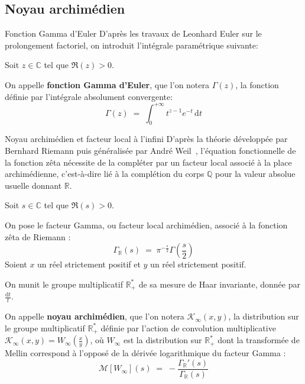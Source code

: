 \documentclass[Riemann_Hypothesis.tex]{subfiles}
\begin{document}
\color{red}
\subsection{Noyau archimédien}
\color{black}

\begin{DefNef}[label=df:FonctionGammaEuler_fr]{Fonction Gamma d'Euler}
    D'après les travaux de Leonhard Euler sur le prolongement factoriel,
    on introduit l'intégrale paramétrique suivante: \par
    Soit $z \in \mathbb{C}$ tel que $\Re(z) > 0$. \par
    On appelle \textbf{fonction Gamma d'Euler}, que l'on notera $\Gamma(z)$,
    la fonction définie par l'intégrale absolument convergente:
    \begin{equation*}
        \Gamma(z) \;=\; \int_{0}^{+\infty} t^{z-1} e^{-t} \,\mathrm{d}t
    \end{equation*}
\end{DefNef}

\begin{DefNef}[label=df:NoyauArchimedien_fr]{Noyau archimédien et facteur local à l'infini}
    D'après la théorie développée par Bernhard Riemann puis généralisée par André 
    Weil~\cite{weil1952_formules},
    l'équation fonctionnelle de la fonction zêta nécessite de la compléter par un facteur local associé à la place archimédienne, c'est-à-dire lié à la complétion du corps $\mathbb{Q}$ pour la valeur absolue usuelle donnant $\mathbb{R}$. \par
    Soit $s \in \mathbb{C}$ tel que $\Re(s) > 0$. \par
    On pose le facteur Gamma, ou facteur local archimédien, associé à la fonction zêta de Riemann :
    \begin{equation*}
        \Gamma_{\mathbb{R}}(s) \;=\; \pi^{-\frac{s}{2}} \Gamma\left(\frac{s}{2}\right)
    \end{equation*}
    Soient $x$ un réel strictement positif et $y$ un réel strictement positif. \par
    On munit le groupe multiplicatif $\mathbb{R}_+^*$ de sa mesure de Haar invariante, donnée par $\frac{\mathrm{d}t}{t}$. \par
    On appelle \textbf{noyau archimédien}, que l'on notera $\mathcal{K}_{\infty}(x,y)$, la distribution sur le groupe multiplicatif $\mathbb{R}_+^*$ définie par l'action de convolution multiplicative $\mathcal{K}_{\infty}(x,y) = W_{\infty}\left(\frac{x}{y}\right)$, où $W_{\infty}$ est la distribution sur $\mathbb{R}_+^*$ dont la transformée de Mellin correspond à l'opposé de la dérivée logarithmique du facteur Gamma :
    \begin{equation*}
        \mathcal{M}[W_{\infty}](s) \;=\; -\frac{\Gamma_{\mathbb{R}}'(s)}{\Gamma_{\mathbb{R}}(s)}
    \end{equation*}
\end{DefNef}
\end{document}
